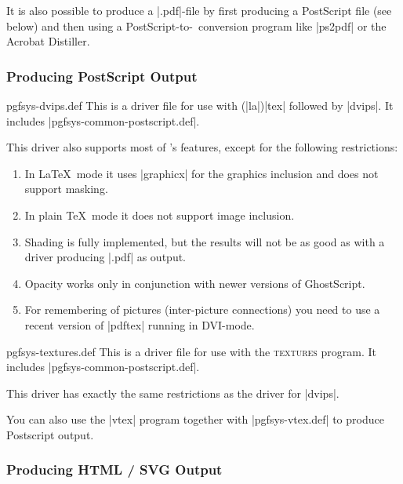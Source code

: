 It is also possible to produce a |.pdf|-file by first producing a
PostScript file (see below) and then using a PostScript-to-\pdf\
conversion program like |ps2pdf| or the Acrobat Distiller.


\subsubsection{Producing PostScript Output}

\begin{filedescription}{pgfsys-dvips.def}
  This is a driver file for use with (|la|)|tex| followed by
  |dvips|. It includes |pgfsys-common-postscript.def|.

  This driver also supports most of \pgfname's features, except for
  the following restrictions:
  \begin{enumerate}
  \item
    In \LaTeX\ mode it uses |graphicx| for the graphics
    inclusion and does not support masking.
  \item
    In plain \TeX\ mode it does not support image inclusion.
  \item
    Shading is fully implemented, but the results will not be 
    as good as with a driver producing |.pdf| as output. 
  \item
    Opacity works only in conjunction with newer versions of
    GhostScript. 
  \item
    For remembering of pictures (inter-picture connections) you need
    to use a recent version of |pdftex| running in DVI-mode.
  \end{enumerate}
\end{filedescription}

\begin{filedescription}{pgfsys-textures.def}
  This is a driver file for use with the \textsc{textures} program. It
  includes |pgfsys-common-postscript.def|. 

  This driver has exactly the same restrictions as the driver for
  |dvips|. 
\end{filedescription}

You can also use the |vtex| program together with |pgfsys-vtex.def| to
produce Postscript output.



\subsubsection{Producing HTML / SVG Output}

